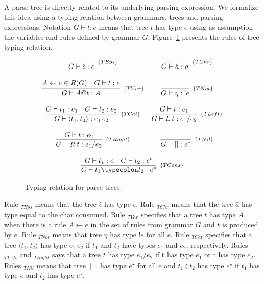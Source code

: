 A parse tree is directly related to its underlying parsing expression.
We formalize this idea using a typing relation between grammars, trees and
parsing expressions. Notation $G\vdash t : e$ means that tree $t$ has
type $e$ using as assumption the variables and rules defined by grammar $G$.
Figure~\ref{fig:tree-typing} presents the rules of tree typing relation.

\begin{figure}[H]
  \[
    \begin{array}{cc}
      \infer[_{\{TEps\}}]{G \vdash \hat{\epsilon} : \epsilon}{} &
      \infer[_{\{TChr\}}]{G\vdash \hat{a} : a}{} \\ \\
      \infer[_{\{TVar\}}]{ G \vdash A@t : A}
                      {A \leftarrow e \in R(G) & G\vdash t : e} &
      \infer[_{\{TNot\}}]{G\vdash \eta :\: ! e}{}\\ \\
      \infer[_{\{TCat\}}]{G\vdash \langle t_1, t_2\rangle : e_1\,e_2}
                      {G\vdash  t_1 : e_1 & G\vdash t_2 : e_2} &
      \infer[_{\{TLeft\}}]{G\vdash L\:t : e_1 / e_2}
                       {G\vdash t : e_1} \\ \\
      \infer[_{\{TRight\}}]{G\vdash R\:t : e_1 / e_2}
                       {G\vdash t : e_2} &
      \infer[_{\{TNil\}}]{G \vdash [] : e^*}{}\\ \\
      \multicolumn{2}{c}{
        \infer[_{\{TCons\}}]{G \vdash t_1  \typecolon  t_2 : e^*}
                         {G\vdash t_1 : e &
                          G \vdash t_2 : e^*}
      }
    \end{array}
  \]
  \centering
  \caption{Typing relation for parse trees.}
  \label{fig:tree-typing}
\end{figure}

Rule \(_{TEps}\) means that the tree \(\hat{\epsilon}\) has type \(\epsilon\).
Rule \(_{TChr}\) means that the tree \(\hat{a}\) has type equal to the char consumed.
Rule \(_{TVar}\) specifies that a tree \(t\) has type \(A\) when there is a rule 
\(A \leftarrow e\) in the set of rules from grammar \(G\) and \(t\) is produced
by \(e\). Rule \(_{TNot}\) means that tree \(\eta\) has type \(!e\) for all \(e\). 
Rule \(_{TCat}\) specifies that a tree \(\langle t_1, t_2\rangle\) has type 
\(e_1\:e_2\) if \(t_1\) and \(t_2\) have types \(e_1\) and \(e_2\), respectively. 
Rules \(_{TLeft}\) and \(_{TRight}\) says that a tree \(t\) has type \(e_1 / e_2\) 
if t has type \(e_1\) or t has type \(e_2\). Rules \(_{TNil}\) means that tree 
\([]\) has type \(e^\star\) for all \(e\) and \(t_1  \typecolon  t_2\) has type \(e^\star\) 
if \(t_1\) has type \(e\) and \(t_2\) has type \(e^\star\).
 
